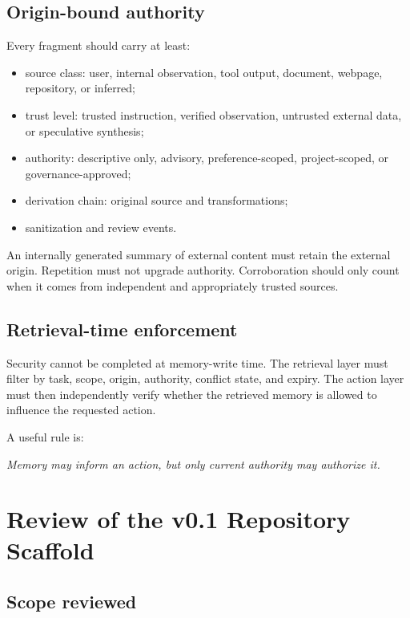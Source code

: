 \documentclass[11pt,a4paper]{article}
\begin{document}
\subsection{Origin-bound authority}

Every fragment should carry at least:

\begin{itemize}
  \item source class: user, internal observation, tool output, document, webpage, repository, or inferred;
  \item trust level: trusted instruction, verified observation, untrusted external data, or speculative synthesis;
  \item authority: descriptive only, advisory, preference-scoped, project-scoped, or governance-approved;
  \item derivation chain: original source and transformations;
  \item sanitization and review events.
\end{itemize}

An internally generated summary of external content must retain the external origin. Repetition must not upgrade authority. Corroboration should only count when it comes from independent and appropriately trusted sources.

\subsection{Retrieval-time enforcement}

Security cannot be completed at memory-write time. The retrieval layer must filter by task, scope, origin, authority, conflict state, and expiry. The action layer must then independently verify whether the retrieved memory is allowed to influence the requested action.

A useful rule is:

\begin{center}
\emph{Memory may inform an action, but only current authority may authorize it.}
\end{center}

\section{Review of the v0.1 Repository Scaffold}

\subsection{Scope reviewed}
\end{document}
